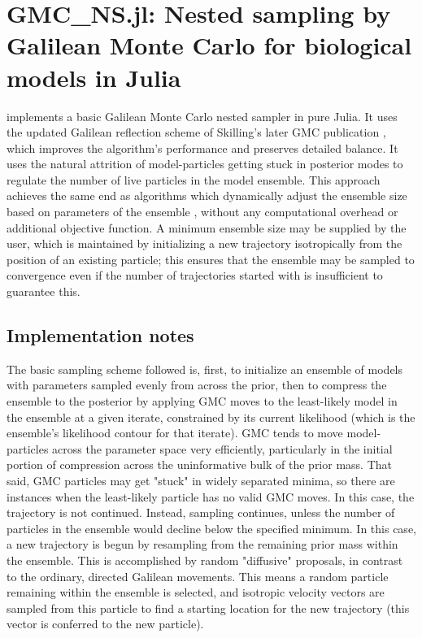 \chapter{GMC\_NS.jl: Nested sampling by Galilean Monte Carlo for biological models in Julia}
\label{ch:GMC}
 implements a basic Galilean Monte Carlo nested sampler \cite{Skilling2012,Skilling2019} in pure Julia. It uses the updated Galilean reflection scheme of Skilling's later GMC publication \cite{Skilling2019}, which improves the algorithm's performance and preserves detailed balance. It uses the natural attrition of model-particles getting stuck in posterior modes to regulate the number of live particles in the model ensemble. This approach achieves the same end as algorithms which dynamically adjust the ensemble size based on parameters of the ensemble \cite{Feroz2009,Higson2019}, without any computational overhead or additional objective function. A minimum ensemble size may be supplied by the user, which is maintained by initializing a new trajectory isotropically from the position of an existing particle; this ensures that the ensemble may be sampled to convergence even if the number of trajectories started with is insufficient to guarantee this. 

\section{Implementation notes}

The basic sampling scheme followed is, first, to initialize an ensemble of models with parameters sampled evenly from across the prior, then to compress the ensemble to the posterior by applying GMC moves to the least-likely model in the ensemble at a given iterate, constrained by its current likelihood (which is the ensemble's likelihood contour for that iterate). GMC tends to move model-particles across the parameter space very efficiently, particularly in the initial portion of compression across the uninformative bulk of the prior mass. That said, GMC particles may get "stuck" in widely separated minima, so there are instances when the least-likely particle has no valid GMC moves. In this case, the trajectory is not continued. Instead, sampling continues, unless the number of particles in the ensemble would decline below the specified minimum. In this case, a new trajectory is begun by resampling from the remaining prior mass within the ensemble. This is accomplished by random "diffusive" proposals, in contrast to the ordinary, directed Galilean movements. This means a random particle remaining within the ensemble is selected, and isotropic velocity vectors are sampled from this particle to find a starting location for the new trajectory (this vector is conferred to the new particle).

